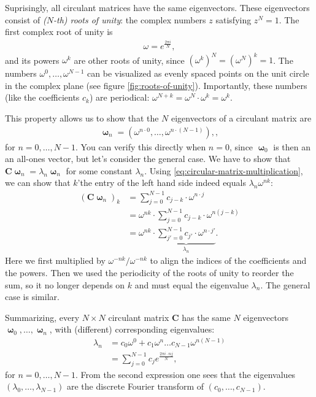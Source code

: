 \documentclass[a4paper, fontsize=9pt, twocolumn]{scrreprt}
\newcommand{\vect}[1]{\mathrm{\mathbf{#1}}}
\newcommand{\vC}{\vect C}
\newcommand{\vomega}{\boldsymbol{\upomega}}
\begin{document}
Suprisingly, all circulant matrices have the same eigenvectors.
These eigenvectors consist of \emph{($N$-th) roots of unity}: the complex numbers $z$ satisfying $z^N = 1$.
The first complex root of unity is
\begin{align}
    \omega = e^{\frac{2\pi i}{N}},
\end{align}
and its powers $\omega^k$ are other roots of unity, since $(\omega^k)^N = (\omega^N)^k = 1$. 
The numbers $\omega^0, \dots, \omega^{N-1}$ can be visualized as evenly spaced points on the unit circle in the complex plane (see figure \ref{fig:roots-of-unity}).
Importantly, these numbers (like the coefficients $c_k$) are periodical: $\omega^{N+k} = \omega^N \cdot \omega^k = \omega^k$. 

This property allows us to show that the $N$ eigenvectors of a circulant matrix are
\begin{align}
    \vomega_n = (\omega^{n \cdot 0}, \dots, \omega^{n\cdot(N-1)}),
 ,\end{align}
for $n=0, \dots, N-1$.
You can verify this directly when $n=0$, since $\vomega_0$ is then an an all-ones vector, but let's consider the general case.
We have to show that $\vC \vomega_n = \lambda_n \vomega_n$ for some constant $\lambda_n$. 
Using \eqref{eq:circular-matrix-multiplication}, we can show that $k$'the entry of the left hand side indeed equals $\lambda_n \omega^{nk}$:
\begin{align}
    (\vC \vomega_n)_k 
        &= \sum_{j=0}^{N-1} c_{j-k} \cdot \omega^{n \cdot j} \\
        &= \omega^{nk} \cdot \sum_{j=0}^{N-1} c_{j-k}  \cdot \omega^{n(j-k)} \\
        &= \omega^{nk} \cdot \underbrace{
            \sum_{j'=0}^{N-1} c_{j'}  \cdot \omega^{n\cdot j'}
        }_{\lambda_n}.
\end{align}
Here we first multiplied by $\omega^{-nk}/\omega^{-nk}$ to align the indices of the coefficients and the powers. 
Then we used the periodicity of the roots of unity to reorder the sum,
so it no longer depends on $k$ and must equal the eigenvalue $\lambda_n$.
The general case is similar.


Summarizing, every $N\times N$ circulant matrix $\vC$ has the same $N$ eigenvectors $\vomega_0, \dots, \vomega_n$, with (different) corresponding eigenvalues:
\begin{align}
    \label{eq:eigen-pair-circulant-matrix}
    \lambda_n 
        &= c_0 \omega^0 + c_1 \omega^{n} \dots c_{N-1} \omega^{n(N-1)} \\
        &=
        \sum_{j=0}^{N-1} c_j e^{\frac{2\pi i \cdot nj}{N}},
\end{align}
for $n=0, \dots, N-1$.
From the second expression one sees that the eigenvalues $(\lambda_0, \dots, \lambda_{N-1})$ are the discrete Fourier transform of $(c_0, \dots, c_{N-1})$.
\end{document}
